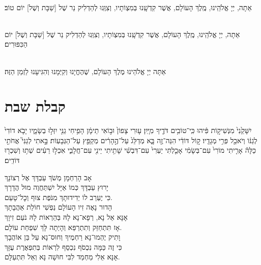 \documentclass[twoside, openany, parskip=half, 11pt]{book}
\begin{document}
\\
אַתָה, יְיָ אֱלֹהֵֽינוּ, מֶֽלֶךְ הָעוֹלָם, אֲשֶׁר קִדְשָֽׁנוּ בְּמִצְוֹתָיו, וְצִוְּֽנוּ לְהַדְלִיק נֵר שֶׁל
[שַׁבָּת וְשֶׁל] יוֹם טוֹב׃

\\
אַתָה, יְיָ אֱלֹהֵֽינוּ, מֶֽלֶךְ הָעוֹלָם, אֲשֶׁר קִדְשָֽׁנוּ בְּמִצְוֹתָיו, וְצִוְּֽנוּ לְהַדְלִיק נֵר שֶׁל
[שַׁבָּת וְשֶׁל] יוֹם הַכִּפּוּרִים׃

\\
אַתָּה יְיָ אֱלֹהֵינוּ מֶלֶךְ הָעוֹלָם, שֶׁהֶחֱיָנוּ וְקִיְּמָנוּ וְהִגִּיעָנוּ לַזְמַן הַזֶּה׃



\chapter[קבלת שבת]{ קבלת שבת }
\label{kabalas_shabbos}


יִשָּׁקֵ֙נִי֙ מִנְּשִׁיק֣וֹת פִּ֔יהוּ כִּֽי־טוֹבִ֥ים דֹּדֶ֖יךָ מִיָּֽיִן׃
ע֤וּרִי צָפוֹן֙ וּב֣וֹאִי תֵימָ֔ן הָפִ֥יחִי גַנִּ֖י יִזְּל֣וּ בְשָׂמָ֑יו יָבֹ֤א דוֹדִי֙ לְגַנּ֔וֹ וְיֹאכַ֖ל פְּרִ֥י מְגָדָֽיו׃ ק֣וֹל דּוֹדִ֔י הִנֵּה־זֶ֖ה בָּ֑א מְדַלֵּג֙ עַל־הֶ֣הָרִ֔ים מְקַפֵּ֖ץ עַל־הַגְּבָעֽוֹת׃ בָּ֣אתִי לְגַנִּי֮ אֲחֹתִ֣י כַלָּה֒ אָרִ֤יתִי מוֹרִי֙ עִם־בְּשָׂמִ֔י אָכַ֤לְתִּי יַעְרִי֙ עִם־דִּבְשִׁ֔י שָׁתִ֥יתִי יֵינִ֖י עִם־חֲלָבִ֑י אִכְל֣וּ רֵעִ֔ים שְׁת֥וּ וְשִׁכְר֖וּ דּוֹדִֽים׃


אָב הָרַחְמָן מְשֹׁךְ עַבְדָּךְ אֶל רְצוֹנָךְ\\
יָרוּץ עַבְדָּךְ כְּמוֹ אַיָּל יִשְׁתַּחֲוֶה מוּל הֲדָרָךְ\\
כִּי יֶעְרַב לוֹ יְדִידוּתָךְ מִנֹּפֶת צוּף וְכׇל־טָעַם.\\


הָדוּר נָאֶה זִיו הָעוֹלָם נַפְשִׁי חוֹלַת אַהֲבָתָךְ\\
אָנָּא אֵל נָא, רְפָא־נָא לָהּ בְּהַרְאוֹת לָהּ נֹעַם זִיוָךְ\\
אָז תִּתְחַזֵּק וְתִתְרַפֵּא וְהָיְתָה לָּךְ שִׁפְחַת עוֹלָם.\\


וָתִיק יֶהְמוּ־נָא רַחְמֶיךָ וְחוּס־נָא עַל בֵּן אוֹהֲבָךְ\\
כִּי זֶה כַּמָּה נִכְסֹף נִכְסַף לִרְאוֹת בְּתִפְאֶרֶת עֻזָּךְ\\
אָנָּא אֵלִי מַחְמַד לִבִּי חוּשָׁה נָּא וְאַל תִּתְעַלָּם.\\
\end{document}

